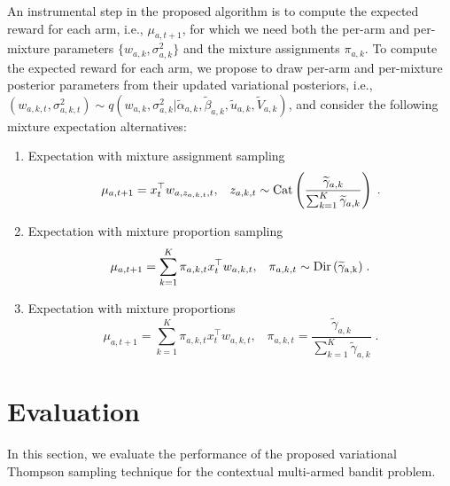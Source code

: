 \documentclass{article}
\newcommand{\ie}{i.e., }
\newcommand{\Dir}[1]{{\rm Dir\left( #1\right)}}
\newcommand{\Cat}[1]{{\rm Cat}\left( #1\right)}
\begin{document}
An instrumental step in the proposed algorithm is to compute the expected reward for each arm, \ie $\mu_{a,t+1}$, for which we need both the per-arm and per-mixture parameters $\{w_{a,k}, \sigma^{2}_{a,k}\}$ and the mixture assignments $\pi_{a,k}$.
To compute the expected reward for each arm, we propose to draw per-arm and per-mixture posterior parameters from their updated variational posteriors, \ie $(w_{a,k,t}, \sigma^2_{a,k,t}) \sim q\left(w_{a,k}, \sigma^2_{a,k}|\widetilde{\alpha}_{a,k}, \widetilde{\beta}_{a,k}, \widetilde{u}_{a,k}, \widetilde{V}_{a,k}\right)$,
and consider the following mixture expectation alternatives:
\begin{enumerate}
	\item Expectation with mixture assignment sampling
	\begin{equation}
	\mu_{a,t+1}=x_{t}^\top w_{a,z_{a,k,t},t}, \; \; \;  z_{a,k,t} \sim \Cat{\frac{\widetilde{\gamma}_{a,k}}{\sum_{k=1}^{K}\widetilde{\gamma}_{a,k}} } \;.
	\end{equation}
	\item Expectation with mixture proportion sampling
	\begin{equation}
	\mu_{a,t+1}=\sum_{k=1}^K \pi_{a,k,t} x_{t}^\top w_{a,k,t}, \; \; \; \pi_{a,k,t} \sim \Dir{\widetilde{\gamma}_{a,k} } \;.
	\end{equation}
	\item Expectation with mixture proportions
	\begin{equation}
	\mu_{a,t+1}=\sum_{k=1}^K \pi_{a,k,t} x_{t}^\top w_{a,k,t}, \; \; \; \pi_{a,k,t} = \frac{\widetilde{\gamma}_{a,k}}{\sum_{k=1}^{K}\widetilde{\gamma}_{a,k}} \;.
	\end{equation}
\end{enumerate}

\section{Evaluation}
\label{sec:evaluation}

In this section, we evaluate the performance of the proposed variational Thompson sampling technique for the contextual multi-armed bandit problem.
\end{document}
